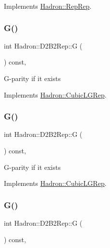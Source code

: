 Implements \mbox{\hyperlink{structHadron_1_1RepRep_a92c8802e5ed7afd7da43ccfd5b7cd92b}{Hadron\+::\+Rep\+Rep}}.

\mbox{\label{structHadron_1_1D2B2Rep_a741b356ccf73029f43f20511be4f6ef3}} 
\subsubsection{\texorpdfstring{G()}{G()}\hspace{0.1cm}{\footnotesize\ttfamily [1/3]}}
{\footnotesize\ttfamily int Hadron\+::\+D2\+B2\+Rep\+::G (\begin{DoxyParamCaption}{ }\end{DoxyParamCaption}) const\hspace{0.3cm}{\ttfamily [inline]}, {\ttfamily [virtual]}}

G-\/parity if it exists 

Implements \mbox{\hyperlink{structHadron_1_1CubicLGRep_ace26f7b2d55e3a668a14cb9026da5231}{Hadron\+::\+Cubic\+L\+G\+Rep}}.

\mbox{\label{structHadron_1_1D2B2Rep_a741b356ccf73029f43f20511be4f6ef3}} 
\subsubsection{\texorpdfstring{G()}{G()}\hspace{0.1cm}{\footnotesize\ttfamily [2/3]}}
{\footnotesize\ttfamily int Hadron\+::\+D2\+B2\+Rep\+::G (\begin{DoxyParamCaption}{ }\end{DoxyParamCaption}) const\hspace{0.3cm}{\ttfamily [inline]}, {\ttfamily [virtual]}}

G-\/parity if it exists 

Implements \mbox{\hyperlink{structHadron_1_1CubicLGRep_ace26f7b2d55e3a668a14cb9026da5231}{Hadron\+::\+Cubic\+L\+G\+Rep}}.

\mbox{\label{structHadron_1_1D2B2Rep_a741b356ccf73029f43f20511be4f6ef3}} 
\subsubsection{\texorpdfstring{G()}{G()}\hspace{0.1cm}{\footnotesize\ttfamily [3/3]}}
{\footnotesize\ttfamily int Hadron\+::\+D2\+B2\+Rep\+::G (\begin{DoxyParamCaption}{ }\end{DoxyParamCaption}) const\hspace{0.3cm}{\ttfamily [inline]}, {\ttfamily [virtual]}}

